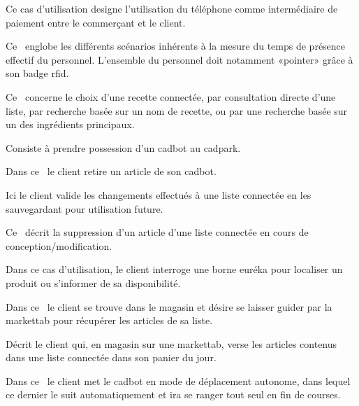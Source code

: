 Ce cas d'utilisation designe l'utilisation du téléphone comme intermédiaire de paiement entre le commerçant et le client. 

Ce \cu\ englobe les différents scénarios inhérents à la mesure du temps de présence effectif du personnel.
L'ensemble du personnel doit notamment «pointer» grâce à son badge rfid.

Ce \cu\ concerne le choix d'une recette connectée, par consultation directe d'une liste, par recherche basée sur un nom de recette, ou par une recherche basée sur un des ingrédients principaux.

Consiste à prendre possession d'un cadbot au cadpark.

Dans ce \cu\ le client retire un article de son cadbot.

Ici le client valide les changements effectués à une liste connectée en les sauvegardant pour utilisation future.

Ce \cu\ décrit la suppression d'un article d'une liste connectée en cours de conception/modification.

Dans ce cas d'utilisation, le client interroge une borne euréka pour localiser un produit ou s'informer de sa disponibilité.

Dans ce \cu\ le client se trouve dans le magasin et désire se laisser guider par la markettab pour récupérer les articles de sa liste.

Décrit le client qui, en magasin sur une markettab, verse les articles contenus dans une liste connectée dans son panier du jour.

Dans ce \cu\ le client met le cadbot en mode de déplacement autonome, dans lequel ce dernier le suit automatiquement et ira se ranger tout seul en fin de courses.
\par
